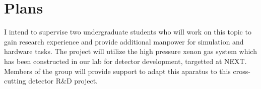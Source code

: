 \section*{\textbf{Plans}}
I intend to supervise two undergraduate students who will work on this topic to gain research experience and provide additional manpower for simulation and hardware tasks. The project will utilize the high pressure xenon gas system which has been constructed in our lab for detector development, targetted at NEXT.  Members of the group will provide support to adapt this aparatus to this cross-cutting detector R\&D project.